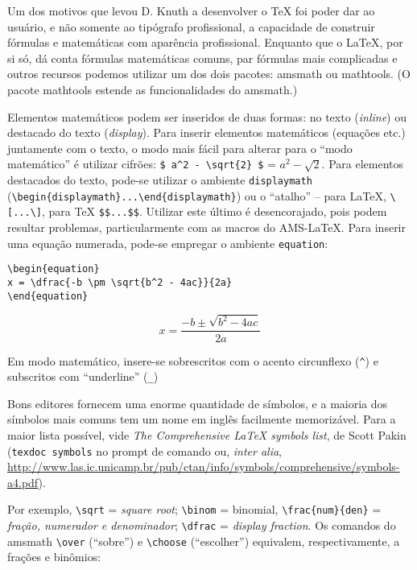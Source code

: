 
Um dos motivos que levou D. Knuth a desenvolver o \TeX{} foi poder dar ao usuário, e não somente ao tipógrafo profissional, a capacidade de construir fórmulas e matemáticas com aparência profissional. Enquanto que  o \LaTeX, por si só, dá conta fórmulas matemáticas comuns, par fórmulas mais complicadas e outros recursos podemos utilizar um dos dois pacotes: \textsf{amsmath} ou \textsf{mathtools}. (O pacote \textsf{mathtools} estende as funcionalidades do \textsf{amsmath}.)

Elementos matemáticos podem ser inseridos de duas formas: no texto (\textit{inline}) ou destacado do texto (\textit{display}). Para inserir elementos matemáticos (equações etc.) juntamente com o texto, o modo mais fácil para alterar para o ``modo matemático'' é utilizar cifrões: \verb+$ a^2 - \sqrt{2} $+ = $ a^2 - \sqrt{2} $. Para elementos destacados do texto, pode-se utilizar o ambiente \texttt{displaymath} (\verb+\begin{displaymath}...\end{displaymath}+) ou o ``atalho'' -- para \LaTeX{}, \verb+\[...\]+, para \TeX{} \verb+$$...$$+. Utilizar este último é desencorajado, pois podem resultar problemas, particularmente com as macros do AMS-\LaTeX. Para inserir uma equação numerada, pode-se empregar o ambiente \texttt{equation}:

\begin{verbatim}
\begin{equation}
x = \dfrac{-b \pm \sqrt{b^2 - 4ac}}{2a}
\end{equation}
\end{verbatim}


\begin{equation}
x = \dfrac{-b \pm \sqrt{b^2 - 4ac}}{2a}
\end{equation}


Em modo matemático, insere-se sobrescritos com o acento circunflexo (\verb+^+) e subscritos com ``underline'' (\verb+_+)

Bons editores fornecem uma enorme quantidade de símbolos, e a maioria dos símbolos mais comuns tem um nome em inglês facilmente memorizável. Para a maior lista possível, vide \textit{The Comprehensive \LaTeX{} symbols list}, de Scott Pakin (\verb+texdoc symbols+ no prompt de comando ou, \textit{inter alia}, \url{http://www.las.ic.unicamp.br/pub/ctan/info/symbols/comprehensive/symbols-a4.pdf}). 

Por exemplo, \verb+\sqrt+ = \textit{square root}; \verb+\binom+ = binomial, \verb+\frac{num}{den}+ = \textit{fração, numerador e denominador}; \verb+\dfrac+ = \textit{display fraction}. Os comandos do \textsf{amsmath} \verb+\over+ (``sobre'') e \verb+\choose+ (``escolher'') equivalem, respectivamente, a frações e binômios:



